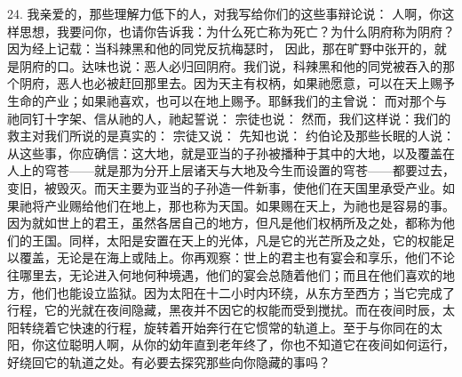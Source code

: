 24. 我亲爱的，那些理解力低下的人，对我写给你们的这些事辩论说： 人啊，你这样思想，我要问你，也请你告诉我：为什么死亡称为死亡？为什么阴府称为阴府？因为经上记载：当科辣黑和他的同党反抗梅瑟时， 因此，那在旷野中张开的，就是阴府的口。达味也说：恶人必归回阴府。我们说，科辣黑和他的同党被吞入的那个阴府，恶人也必被赶回那里去。因为天主有权柄，如果祂愿意，可以在天上赐予生命的产业；如果祂喜欢，也可以在地上赐予。耶稣我们的主曾说： 而对那个与祂同钉十字架、信从祂的人，祂起誓说： 宗徒也说： 然而，我们这样说：我们的救主对我们所说的是真实的： 宗徒又说： 先知也说： 约伯论及那些长眠的人说： 从这些事，你应确信：这大地，就是亚当的子孙被播种于其中的大地，以及覆盖在人上的穹苍——就是那为分开上层诸天与大地及今生而设置的穹苍——都要过去，变旧，被毁灭。而天主要为亚当的子孙造一件新事，使他们在天国里承受产业。如果祂将产业赐给他们在地上，那也称为天国。如果赐在天上，为祂也是容易的事。因为就如世上的君王，虽然各居自己的地方，但凡是他们权柄所及之处，都称为他们的王国。同样，太阳是安置在天上的光体，凡是它的光芒所及之处，它的权能足以覆盖，无论是在海上或陆上。你再观察：世上的君主也有宴会和享乐，他们不论往哪里去，无论进入何地何种境遇，他们的宴会总随着他们；而且在他们喜欢的地方，他们也能设立监狱。因为太阳在十二小时内环绕，从东方至西方；当它完成了行程，它的光就在夜间隐藏，黑夜并不因它的权能而受到搅扰。而在夜间时辰，太阳转绕着它快速的行程，旋转着开始奔行在它惯常的轨道上。至于与你同在的太阳，你这位聪明人啊，从你的幼年直到老年终了，你也不知道它在夜间如何运行，好绕回它的轨道之处。有必要去探究那些向你隐藏的事吗？\par

